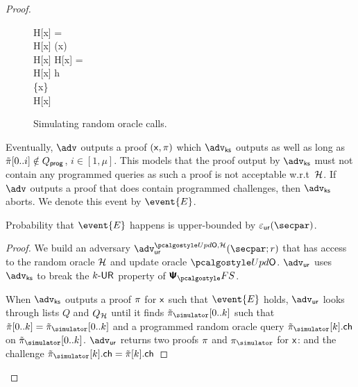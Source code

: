\begin{proof}
	
	\begin{figure}
		\centering
			\begin{pcvstack}
			\begin{pchstack}
				{
				\pcif H[x] = \bot \pcthen \\
				\pcind H[x] \gets \ro(x) \\
				\pcreturn H[x]
		  		}
				\pchspace
				{ 
					\pcif H[x] = \bot \pcthen \\ 
					\pcind H[x] \gets h \\
					\pcind \Qprog \gets \Qprog \cup \{x\}\\
					\pcreturn H[x]
				}
			\end{pchstack}
		\end{pcvstack}
		\caption{Simulating random oracle calls.}
		\label{fig:simulator_oracles}
	\end{figure}	
%

	Eventually, $\advse$ outputs a proof $(\mathsf{x}, \pi)$ which $\advcss$ outputs as well as long as $\tilde{\pi}[0..i] \notin Q_{\mathsf{prog}}$, $i\in[1,\mu]$. This models that the proof output by $\advcss$ must not contain any programmed queries as such a proof is not acceptable w.r.t~$\mathcal{H}$. If $\advse$ outputs a proof that does contain programmed challenges, then $\advcss$ aborts. We denote this event by $\event{E}$.
	
	\begin{lemma}
		Probability that $\event{E}$ happens is upper-bounded by $\epsur(\secpar)$. 
	\end{lemma}
	\begin{proof}

	We build an adversary $\advur^{\initU, \ro} (\secpar; r)$ that has access to the random oracle $\mathcal{H}$ and update oracle $\initU$. $\advur$ uses $\advcss$ to break the ${k\text{-}\mathsf{UR}}$ property of $\psfs$. 

	When $\advcss$ outputs a proof $\pi$ for $\mathsf{x}$ such that $\event{E}$ holds, $\advur$ looks through lists $Q$ and $Q_{\mathcal{H}}$ until it finds $\tzkproofs[0..k]$ such that $\tzkproof[0..k] = \tzkproofs[0..k]$ and a programmed random oracle query $\tzkproofs[k].\ch$ on $\tzkproofs[0..k]$.	$\advur$ returns two proofs $\pi$ and $\zkproofs$ for $\mathsf{x}$:
		and the challenge $\tzkproofs[k].\ch=\tzkproof[k].\ch$


\end{proof}
\end{proof}

